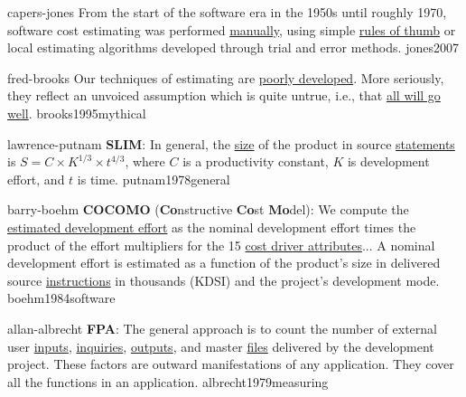\documentclass{article}
\begin{document}

\lnQuote
  {capers-jones}
  {From the start of the software era in the 1950s until roughly 1970, software cost estimating was performed \ul{manually}, using simple \ul{rules of thumb} or local estimating algorithms developed through trial and error methods.}
  {jones2007}

\lnQuote
  {fred-brooks}
  {Our techniques of estimating are \ul{poorly developed}. More seriously, they reflect an unvoiced assumption which is quite untrue, i.e., that \ul{all will go well}.}
  {brooks1995mythical}

\lnQuote
  {lawrence-putnam}
  {\textbf{SLIM}: In general, the \ul{size} of the product in source \ul{statements} is \(S = C \times K^{1/3} \times t^{4/3}\), where \(C\) is a productivity constant, \(K\) is development effort, and \(t\) is time.}
  {putnam1978general}

\lnQuote
  {barry-boehm}
  {\textbf{COCOMO} (\textbf{Co}nstructive \textbf{Co}st \textbf{Mo}del): We compute the \ul{estimated development effort} as the nominal development effort times the product of the effort multipliers for the 15 \ul{cost driver attributes}... A nominal development effort is estimated as a function of the product's size in delivered source \ul{instructions} in thousands (KDSI) and the project's development mode.}
  {boehm1984software}

\lnQuote
  {allan-albrecht}
  {\textbf{FPA}: The general approach is to count the number of external user \ul{inputs}, \ul{inquiries}, \ul{outputs}, and master \ul{files} delivered by the development project. These factors are outward manifestations of any application. They cover all the functions in an application.}
  {albrecht1979measuring}

\end{document}
